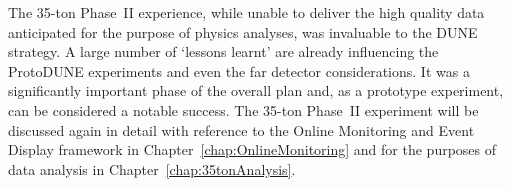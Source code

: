 The 35-ton Phase~II experience, while unable to deliver the high quality data anticipated for the purpose of physics analyses, was invaluable to the DUNE strategy.  A large number of `lessons learnt' are already influencing the ProtoDUNE experiments and even the far detector considerations.  It was a significantly important phase of the overall plan and, as a prototype experiment, can be considered a notable success.  The 35-ton Phase~II experiment will be discussed again in detail with reference to the Online Monitoring and Event Display framework in Chapter~\ref{chap:OnlineMonitoring} and for the purposes of data analysis in Chapter~\ref{chap:35tonAnalysis}.


























